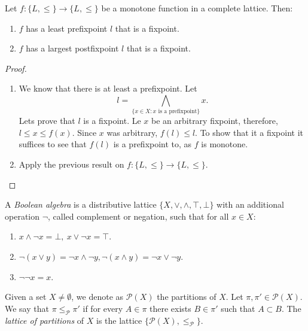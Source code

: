 \begin{theorem}
  \label{the:fixpoint}
  Let $f:\{L,\le\}\to \{L,\le\}$ be a monotone function in a complete lattice. Then:
  \begin{enumerate}
  \item $f$ has a least prefixpoint $l$ that is a fixpoint.
  \item $f$ has a largest postfixpoint $l$ that is a fixpoint.
  \end{enumerate}
\end{theorem}
\begin{proof}\hfill  \begin{enumerate}
  \item We know that there is at least a prefixpoint. Let
    $$l = \bigwedge_{\{x\in X: x\text{ is a prefixpoint}\}} x .$$ 
    Lets prove that $l$ is a fixpoint. Le $x$ be an arbitrary fixpoint, therefore, $l \le x \le f(x)$. Since $x$ was arbitrary, $f(l) \le l$. To show that it a fixpoint it suffices to see that $f(l)$ is a prefixpoint to, as $f$ is monotone.
  \item Apply the previous result on $f:\{L,\le\}\to \{L,\le\}$.
  \end{enumerate}
\end{proof}


\begin{definition}
  A \emph{Boolean algebra} is a distributive lattice  $\{X, \vee, \wedge, \top,\bot\}$ with an additional operation $\neg$, called complement or negation, such that for all $x\in X$:
  \begin{enumerate}
  \item $ x\wedge \neg x = \bot,\ x\vee \neg x = \top $.
  \item $ \neg(x \vee y) = \neg x \wedge \neg y,  \neg(x \wedge y) = \neg x \vee \neg y$.
  \item $\neg \neg x = x$.
  \end{enumerate}
\end{definition}




\begin{definition}
Given a set $X\ne \emptyset$, we denote as $\mathcal{P}(X)$ the partitions of $X$. Let $\pi,\pi'\in \mathcal{P}(X)$. We say that $\pi\le_{\mathcal{P}}\pi'$ if for every $A\in \pi$ there exists $B\in \pi'$ such that $A\subset B$. The \emph{lattice of partitions} of $X$ is the lattice $\{\mathcal{P}(X),\le_{\mathcal{P}}\}$.
\end{definition}

